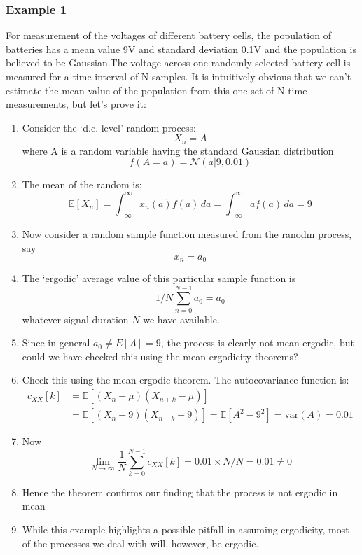\documentclass[12pt]{article}
\newcommand{\intinf}{\int_{-\infty}^{\infty}}
\newcommand{\mexp}{\mathbb{E}}
\newcommand{\gau}{\mathcal{N}}
\begin{document}
\subsubsection{Example 1}
For measurement of the voltages of different battery cells, the population of batteries has a mean value 9V and standard deviation 0.1V and the population is believed to be Gaussian.The voltage across one randomly selected battery cell is measured for a time interval of N samples. It is intuitively obvious that we can’t estimate the mean value of the population from this one set
of N time measurements, but let’s prove it:
\begin{enumerate}


    \item Consider the `d.c. level' random process:
    \[
    X_n = A
    \]
    where A is a random variable having the standard Gaussian distribution
    \[
    f(A=a) = \gau(a|9,0.01)
    \]
    \item The mean of the random is:
    \[
    \mexp[X_n] = \intinf x_n(a)f(a) \,d a = \intinf af(a)\, da =9
    \]
    \item Now consider a random sample function measured from the ranodm process, say
    \[
    x_n = a_0
    \]
    \item The `ergodic' average value of this particular sample function is 
    \[
    1/N \sum_{n=0}^{N-1}a_0 = a_0
    \]
    whatever signal duration $N$ we have available.
    \item Since in general $a_0 \not = E[A] = 9$, the process is clearly not mean ergodic, but could we have checked this using the mean ergodicity theorems?
    \item Check this using the mean ergodic theorem. The autocovariance function is:
    \begin{align*}
        c_{XX}[k] &= \mexp[(X_{n}-\mu)(X_{n+k}-\mu)] \\
        &= \mexp[(X_{n}-9)(X_{n+k}-9)] = \mexp[A^2 - 9^2] = \textrm{var}(A) =0.01
    \end{align*}
    \item Now 
    \[
    \lim_{N\rightarrow \infty}  \frac{1}{N} \sum_{k=0}^{N-1}c_{XX}[k] = 0.01 \times N /N =0.01 \not = 0
    \]
    \item Hence the theorem confirms our finding that the process is not ergodic in mean
    \item While this example highlights a possible pitfall in assuming ergodicity, most of the processes we deal with will, however, be ergodic.
\end{enumerate}
\end{document}
